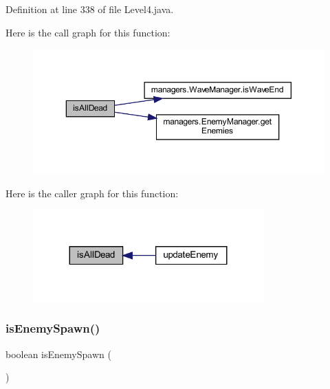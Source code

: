 Definition at line 338 of file Level4.\+java.

Here is the call graph for this function\+:
\nopagebreak
\begin{figure}[H]
\begin{center}
\leavevmode
\includegraphics[width=350pt]{classscenes_1_1_level4_acd1846d50c3d8678777f9ab6716f5cf3_cgraph}
\end{center}
\end{figure}
Here is the caller graph for this function\+:\nopagebreak
\begin{figure}[H]
\begin{center}
\leavevmode
\includegraphics[width=251pt]{classscenes_1_1_level4_acd1846d50c3d8678777f9ab6716f5cf3_icgraph}
\end{center}
\end{figure}
\mbox{\label{classscenes_1_1_level4_a121827ebd1c5b24c92f966721b51c0b9}} 
\subsubsection{\texorpdfstring{is\+Enemy\+Spawn()}{isEnemySpawn()}}
{\footnotesize\ttfamily boolean is\+Enemy\+Spawn (\begin{DoxyParamCaption}{ }\end{DoxyParamCaption})\hspace{0.3cm}{\ttfamily [private]}}



